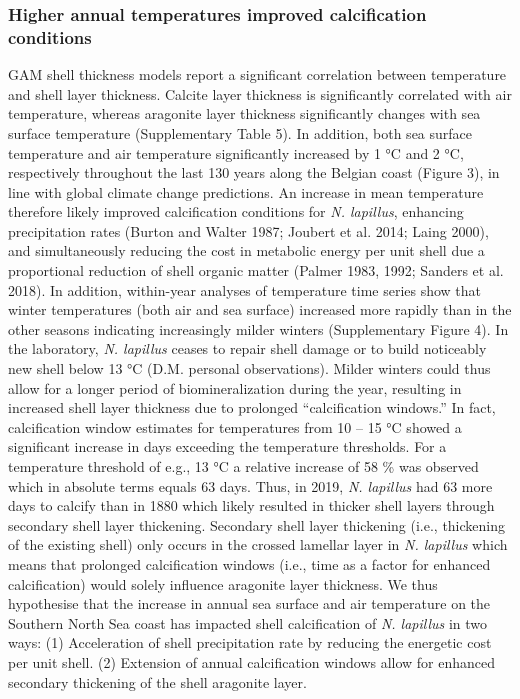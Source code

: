 \documentclass[smallextended]{svjour3}       %
\begin{document}
\hypertarget{higher-annual-temperatures-improved-calcification-conditions}{%
\subsubsection{Higher annual temperatures improved calcification
conditions}\label{higher-annual-temperatures-improved-calcification-conditions}}

GAM shell thickness models report a significant correlation between
temperature and shell layer thickness. Calcite layer thickness is
significantly correlated with air temperature, whereas aragonite layer
thickness significantly changes with sea surface temperature
(Supplementary Table 5). In addition, both sea surface temperature and
air temperature significantly increased by 1 °C and 2 °C, respectively
throughout the last 130 years along the Belgian coast (Figure 3), in
line with global climate change predictions. An increase in mean
temperature therefore likely improved calcification conditions for
\emph{N. lapillus}, enhancing precipitation rates (Burton and Walter
1987; Joubert et al. 2014; Laing 2000), and simultaneously reducing the
cost in metabolic energy per unit shell due a proportional reduction of
shell organic matter (Palmer 1983, 1992; Sanders et al. 2018). In
addition, within-year analyses of temperature time series show that
winter temperatures (both air and sea surface) increased more rapidly
than in the other seasons indicating increasingly milder winters
(Supplementary Figure 4). In the laboratory, \emph{N. lapillus} ceases
to repair shell damage or to build noticeably new shell below 13 °C
(D.M. personal observations). Milder winters could thus allow for a
longer period of biomineralization during the year, resulting in
increased shell layer thickness due to prolonged ``calcification
windows.'' In fact, calcification window estimates for temperatures from
10 -- 15 °C showed a significant increase in days exceeding the
temperature thresholds. For a temperature threshold of e.g., 13 °C a
relative increase of 58 \% was observed which in absolute terms equals
63 days. Thus, in 2019, \emph{N. lapillus} had 63 more days to calcify
than in 1880 which likely resulted in thicker shell layers through
secondary shell layer thickening. Secondary shell layer thickening
(i.e., thickening of the existing shell) only occurs in the crossed
lamellar layer in \emph{N. lapillus} which means that prolonged
calcification windows (i.e., time as a factor for enhanced
calcification) would solely influence aragonite layer thickness. We thus
hypothesise that the increase in annual sea surface and air temperature
on the Southern North Sea coast has impacted shell calcification of
\emph{N. lapillus} in two ways: (1) Acceleration of shell precipitation
rate by reducing the energetic cost per unit shell. (2) Extension of
annual calcification windows allow for enhanced secondary thickening of
the shell aragonite layer.
\end{document}
